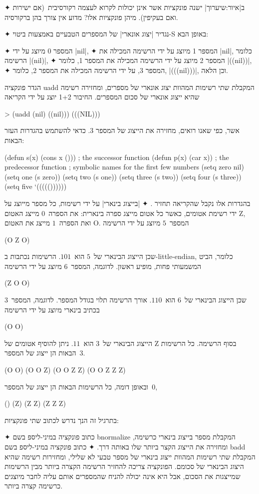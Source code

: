 \begin{enumerate}
  ✦ ב|איור:שיערוך| ישנה פונקציות אשר אינן יכולות לקרוא לעצמה רקורסיבית~(אם
  ישירות ואם בעקיפין). מיהן פונקציות אלו? מדוע אין צורך בהן ברקורסיה.

  ✦ נגדיר \ע|יצוג אונארי| של המספרים הטבעיים באמצעות ביטוי-S באופן הבא:
  \begin{itemize}
    ✦ המספר 0 מיוצג על ידי \E|nil|,
    ✦ המספר 1 מיוצג על ידי הרשימה המכילה את \E|nil|, כלומר הרשימה \E|(nil)|,
    ✦ המספר 2 מיוצג על ידי הרשימה המכילה את המספר 1, כלומר \E|((nil))|,
    ✦ המספר 3, על ידי הרשימה המכילה את המספר 2, כלומר, \E|(((nil)))|,
      וכן הלאה.
  \end{itemize}
  הגדר פונקציה uadd המקבלת שתי רשימות המהוות יצוג אונארי של מספרים,
  ומחזירה רשימה שהיא ייצוג אונארי של סכום המספרים. החיבור 1+2 יוצג על ידי
  הקריאה
  \begin{LISP}
> (uadd (nil) ((nil)))
(((NIL)))
\end{LISP}
  אשר, כפי שאנו רואים, מחזירה את הייצוג של המספר 3.
  כדאי להשתמש בהגדרות העזר הבאות:
  \begin{LISP}
(defun s(x) (cons x ())) ; the successor function
(defun p(x) (car x)) ; the predecessor function
; symbolic names for the first few numbers
(setq zero nil)
(setq one (s zero))
(setq two (s one))
(setq three (s two))
(setq four (s three))
(setq five ‘((((())))))
\end{LISP}
  בהגדרות אלו נקבל שהקריאה
  תחזיר \lisp{((((()))))}.
  ✦ \ע|בייצוג בינארי| על ידי רשימות, כל מספר מייוצג על ידי רשימת אטומים, כאשר כל
  אטום מייצג ספרה בינארית: את הספרה~$0$ מייצג האטום Z, ואת הספרה~$1$ מייצג את
  האטום O. המספר~$5$ מיוצג על ידי הרשימה \begin{LISP}
(O Z O)
\end{LISP} שכן הייצוג הבינארי של~$5$ הוא~$101$. הרשימות נכתבות ב-little-endian,
  כלומר, הביט המשמעותי פחות, מופיע ראשון. לדוגמה, המספר~$6$ מיוצג על ידי הרשימה
  \begin{LISP}
 (Z O O)
 \end{LISP} שכן הייצוג הבינארי של~$6$ הוא~$110$. אורך הרשימה תלוי בגודל המספר.
  לדוגמה, המספר~$3$ בכתיב בינארי מיוצג על ידי הרשימה \begin{LISP}
 (O O)
 \end{LISP} הייצוג הבינארי של~$3$ הוא~$11$. ניתן להוסיף אטומים של Z בסוף
  הרשימה. כל הרשימות הבאות הן ייצוג של המספר~$3$. \begin{LISP}
(O O)
(O O Z)
(O O Z Z)
(O O Z Z Z)
\end{LISP}
  ובאופן דומה, כל הרשימות הבאות הן ייצוג של המספר~$0$,
  \begin{LISP}
()
(Z)
(Z Z)
(Z Z Z)
\end{LISP}
  בתרגיל זה הנך נדרש לכתוב שתי פונקציות:
  \begin{itemize}
    ✦ כתוב פונקציה במיני-ליספ בשם bnormalize המקבלת מספר בייצוג בינארי כרשימה,
    ומחזירה את הייצוג הקצר ביותר שלו באותה דרך.
    ✦ כתוב פונקציה במיני-ליספ בשם badd המקבלת שתי רשימות המהוות ייצוג בינארי
    של מספר טבעי לא שלילי, ומחזירות רשימה שהיא היצוג הבינארי של סכומם.
    הפונקציה צריכה להחזיר הרשימה הקצרה ביותר מבין הרשימות שמייצגות את הסכום,
    אבל היא אינה יכולה להניח שהמספרים אותם עליה לחבר מיוצגים כרשימה קצרה
    ביותר.
  \end{itemize}
\end{enumerate}
